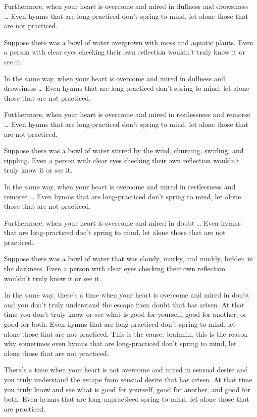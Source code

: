\documentclass[12pt,openany]{book}%
\begin{document}
Furthermore, when your heart is overcome and mired in dullness and drowsiness … Even hymns that are long-practiced don’t spring to mind, let alone those that are not practiced. 

Suppose there was a bowl of water overgrown with moss and aquatic plants. Even a person with clear eyes checking their own reflection wouldn’t truly know it or see it. 

In the same way, when your heart is overcome and mired in dullness and drowsiness … Even hymns that are long-practiced don’t spring to mind, let alone those that are not practiced. 

Furthermore, when your heart is overcome and mired in restlessness and remorse … Even hymns that are long-practiced don’t spring to mind, let alone those that are not practiced. 

Suppose there was a bowl of water stirred by the wind, churning, swirling, and rippling. Even a person with clear eyes checking their own reflection wouldn’t truly know it or see it. 

In the same way, when your heart is overcome and mired in restlessness and remorse … Even hymns that are long-practiced don’t spring to mind, let alone those that are not practiced. 

Furthermore, when your heart is overcome and mired in doubt … Even hymns that are long-practiced don’t spring to mind, let alone those that are not practiced. 

Suppose there was a bowl of water that was cloudy, murky, and muddy, hidden in the darkness. Even a person with clear eyes checking their own reflection wouldn’t truly know it or see it. 

In the same way, there’s a time when your heart is overcome and mired in doubt and you don’t truly understand the escape from doubt that has arisen. At that time you don’t truly know or see what is good for yourself, good for another, or good for both. Even hymns that are long-practiced don’t spring to mind, let alone those that are not practiced. This is the cause, brahmin, this is the reason why sometimes even hymns that are long-practiced don’t spring to mind, let alone those that are not practiced. 

There’s a time when your heart is not overcome and mired in sensual desire and you truly understand the escape from sensual desire that has arisen. At that time you truly know and see what is good for yourself, good for another, and good for both. Even hymns that are long-unpracticed spring to mind, let alone those that are practiced. 
\end{document}
